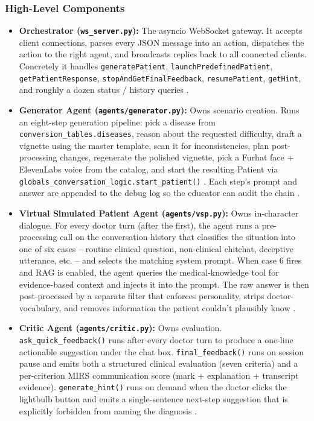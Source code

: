 \documentclass{article}
\begin{document}
\subsubsection{High-Level Components}
\begin{itemize}
    \item \textbf{Orchestrator (\texttt{ws\_server.py}):}
    The asyncio WebSocket gateway. It accepts client connections, parses every JSON message into an action, dispatches the action to the right agent, and broadcasts replies back to all connected clients. Concretely it handles \texttt{generatePatient}, \texttt{launchPredefinedPatient}, \texttt{getPatientResponse}, \texttt{stopAndGetFinalFeedback}, \texttt{resumePatient}, \texttt{getHint}, and roughly a dozen status / history queries \cite{Shen2019ALA}.

    \item \textbf{Generator Agent (\texttt{agents/generator.py}):}
    Owns scenario creation. Runs an eight-step generation pipeline: pick a disease from \texttt{conversion\_tables.diseases}, reason about the requested difficulty, draft a vignette using the master template, scan it for inconsistencies, plan post-processing changes, regenerate the polished vignette, pick a Furhat face + ElevenLabs voice from the catalog, and start the resulting Patient via \texttt{globals\_conversation\_logic.start\_patient()} \cite{Zhao2023ASO}. Each step's prompt and answer are appended to the debug log so the educator can audit the chain \cite{Mahajan2022TextualDQ}.

    \item \textbf{Virtual Simulated Patient Agent (\texttt{agents/vsp.py}):}
    Owns in-character dialogue. For every doctor turn (after the first), the agent runs a pre-processing call on the conversation history that classifies the situation into one of six cases -- routine clinical question, non-clinical chitchat, deceptive utterance, etc. -- and selects the matching system prompt. When case 6 fires and RAG is enabled, the agent queries the medical-knowledge tool for evidence-based context and injects it into the prompt. The raw answer is then post-processed by a separate filter that enforces personality, strips doctor-vocabulary, and removes information the patient couldn't plausibly know \cite{Zhang2023SentimentAI}.

    \item \textbf{Critic Agent (\texttt{agents/critic.py}):}
    Owns evaluation. \texttt{ask\_quick\_feedback()} runs after every doctor turn to produce a one-line actionable suggestion under the chat box. \texttt{final\_feedback()} runs on session pause and emits both a structured clinical evaluation (seven criteria) and a per-criterion MIRS communication score (mark + explanation + transcript evidence). \texttt{generate\_hint()} runs on demand when the doctor clicks the lightbulb button and emits a single-sentence next-step suggestion that is explicitly forbidden from naming the diagnosis \cite{Krugmann2024SentimentAI}.


\end{itemize}
\end{document}
